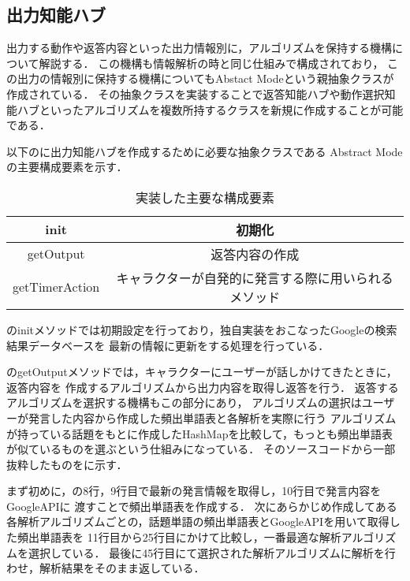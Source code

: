 \subsection{出力知能ハブ}
出力する動作や返答内容といった出力情報別に，アルゴリズムを保持する機構について解説する．
この機構も情報解析の時と同じ仕組みで構成されており，
この出力の情報別に保持する機構についてもAbstact Modeという親抽象クラスが作成されている．
その抽象クラスを実装することで返答知能ハブや動作選択知能ハブといったアルゴリズムを複数所持するクラスを新規に作成することが可能である．

以下のに出力知能ハブを作成するために必要な抽象クラスである
Abstract Modeの主要構成要素を示す．\\

\begin{table}[tbh]
	\caption{実装した主要な構成要素} \label{tab:abstractmode}
	\begin{center}
		\begin{tabular}[htb]{c|c}
		\hline
		init & 初期化 \\
		\hline
		getOutput & 返答内容の作成 \\
		\hline
		getTimerAction & キャラクターが自発的に発言する際に用いられるメソッド \\
		\hline
		\end{tabular}
	\end{center}
\end{table}

のinitメソッドでは初期設定を行っており，独自実装をおこなったGoogleの検索結果データベースを
最新の情報に更新をする処理を行っている．

のgetOutputメソッドでは，キャラクターにユーザーが話しかけてきたときに，返答内容を
作成するアルゴリズムから出力内容を取得し返答を行う．
返答するアルゴリズムを選択する機構もこの部分にあり，
アルゴリズムの選択はユーザーが発言した内容から作成した頻出単語表と各解析を実際に行う
アルゴリズムが持っている話題をもとに作成したHashMapを比較して，もっとも頻出単語表が似ているものを選ぶという仕組みになっている．
そのソースコードから一部抜粋したものをに示す．


まず初めに，の8行，9行目で最新の発言情報を取得し，10行目で発言内容をGoogleAPIに
渡すことで頻出単語表を作成する．
次にあらかじめ作成してある各解析アルゴリズムごとの，話題単語の頻出単語表とGoogleAPIを用いて取得した頻出単語表を
11行目から25行目にかけて比較し，一番最適な解析アルゴリズムを選択している．
最後に45行目にて選択された解析アルゴリズムに解析を行わせ，解析結果をそのまま返している．

